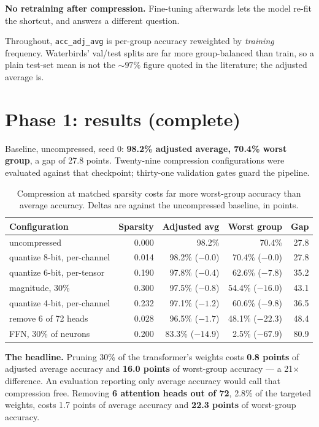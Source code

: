 \documentclass[11pt]{article}
\begin{document}
\textbf{No retraining after compression.} Fine-tuning afterwards lets the model
re-fit the shortcut, and answers a different question.

Throughout, \texttt{acc\_adj\_avg} is per-group accuracy reweighted by
\emph{training} frequency. Waterbirds' val/test splits are far more
group-balanced than train, so a plain test-set mean is not the ${\sim}97\%$
figure quoted in the literature; the adjusted average is.

\section{Phase 1: results (complete)}

Baseline, uncompressed, seed 0: \textbf{98.2\% adjusted average, 70.4\%
worst group}, a gap of 27.8 points. Twenty-nine compression configurations were
evaluated against that checkpoint; thirty-one validation gates guard the
pipeline.

\begin{table}[h]
\centering
\small
\begin{tabular}{@{}lrrrr@{}}
\toprule
Configuration & Sparsity & Adjusted avg & Worst group & Gap \\
\midrule
uncompressed                 & 0.000 & 98.2\%          & 70.4\%          & 27.8 \\
quantize 8-bit, per-channel  & 0.014 & 98.2\% ($-0.0$) & 70.4\% ($-0.0$) & 27.8 \\
quantize 6-bit, per-tensor   & 0.190 & 97.8\% ($-0.4$) & 62.6\% (\textbf{$-7.8$})  & 35.2 \\
magnitude, 30\%              & 0.300 & 97.5\% ($-0.8$) & 54.4\% (\textbf{$-16.0$}) & 43.1 \\
quantize 4-bit, per-channel  & 0.232 & 97.1\% ($-1.2$) & 60.6\% (\textbf{$-9.8$})  & 36.5 \\
remove 6 of 72 heads         & 0.028 & 96.5\% ($-1.7$) & 48.1\% (\textbf{$-22.3$}) & 48.4 \\
FFN, 30\% of neurons         & 0.200 & 83.3\% ($-14.9$)& \phantom{0}2.5\% ($-67.9$) & 80.9 \\
\bottomrule
\end{tabular}
\caption{Compression at matched sparsity costs far more worst-group accuracy than
average accuracy. Deltas are against the uncompressed baseline, in points.}
\end{table}

\textbf{The headline.} Pruning 30\% of the transformer's weights costs
\textbf{0.8 points} of adjusted average accuracy and \textbf{16.0 points} of
worst-group accuracy --- a 21$\times$ difference. An evaluation reporting only
average accuracy would call that compression free. Removing \textbf{6 attention
heads out of 72}, 2.8\% of the targeted weights, costs 1.7 points of average
accuracy and \textbf{22.3 points} of worst-group accuracy.
\end{document}
